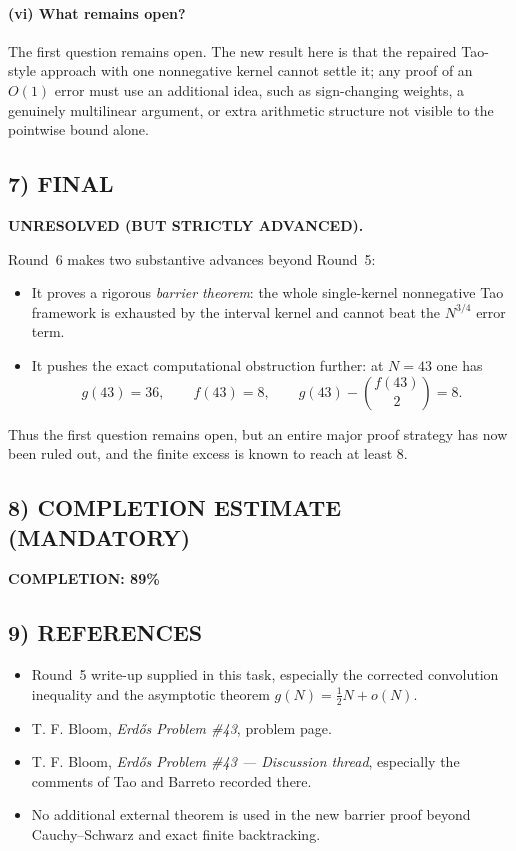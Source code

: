 \paragraph{(vi) What remains open?}
The first question remains open.  The new result here is that the repaired Tao-style approach with one nonnegative kernel cannot settle it; any proof of an $O(1)$ error must use an additional idea, such as sign-changing weights, a genuinely multilinear argument, or extra arithmetic structure not visible to the pointwise bound alone.

\subsection{7) FINAL}

\textbf{UNRESOLVED (BUT STRICTLY ADVANCED).}

Round~6 makes two substantive advances beyond Round~5:
\begin{itemize}
\item It proves a rigorous \emph{barrier theorem}: the whole single-kernel nonnegative Tao framework is exhausted by the interval kernel and cannot beat the $N^{3/4}$ error term.
\item It pushes the exact computational obstruction further: at $N=43$ one has
\[
 g(43)=36,\qquad f(43)=8,\qquad g(43)-\binom{f(43)}2=8.
\]
\end{itemize}
Thus the first question remains open, but an entire major proof strategy has now been ruled out, and the finite excess is known to reach at least $8$.

\subsection{8) COMPLETION ESTIMATE (MANDATORY)}

\textbf{COMPLETION: 89\%}

\subsection{9) REFERENCES}

\begin{itemize}
\item Round~5 write-up supplied in this task, especially the corrected convolution inequality and the asymptotic theorem $g(N)=\frac12N+o(N)$.
\item T. F. Bloom, \emph{Erd\H{o}s Problem \#43}, problem page.
\item T. F. Bloom, \emph{Erd\H{o}s Problem \#43 --- Discussion thread}, especially the comments of Tao and Barreto recorded there.
\item No additional external theorem is used in the new barrier proof beyond Cauchy--Schwarz and exact finite backtracking.
\end{itemize}
